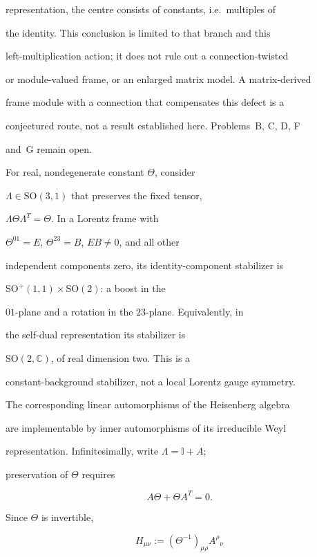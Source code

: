representation, the centre consists of constants, i.e.\ multiples of

the identity. This conclusion is limited to that branch and this

left-multiplication action; it does not rule out a connection-twisted

or module-valued frame, or an enlarged matrix model. A matrix-derived

frame module with a connection that compensates this defect is a

conjectured route, not a result established here. Problems~B, C, D, F

and~G remain open.



For real, nondegenerate constant \(\Theta\), consider

\(\Lambda\in\mathrm{SO}(3,1)\) that preserves the fixed tensor,

\(\Lambda\Theta\Lambda^T=\Theta\). In a Lorentz frame with

\(\Theta^{01}=E\), \(\Theta^{23}=B\), \(EB\ne0\), and all other

independent components zero, its identity-component stabilizer is

\(\mathrm{SO}^+(1,1)\times\mathrm{SO}(2)\): a boost in the

\(01\)-plane and a rotation in the \(23\)-plane. Equivalently, in

the self-dual representation its stabilizer is

\(\mathrm{SO}(2,\mathbb C)\), of real dimension two. This is a

constant-background stabilizer, not a local Lorentz gauge symmetry.



The corresponding linear automorphisms of the Heisenberg algebra

are implementable by inner automorphisms of its irreducible Weyl

representation. Infinitesimally, write \(\Lambda=\mathbb I+A\);

preservation of \(\Theta\) requires

\[

  A\Theta+\Theta A^T=0.

\]

Since \(\Theta\) is invertible,

\[

  H_{\mu\nu}:=(\Theta^{-1})_{\mu\rho}A^\rho{}_\nu

\]

